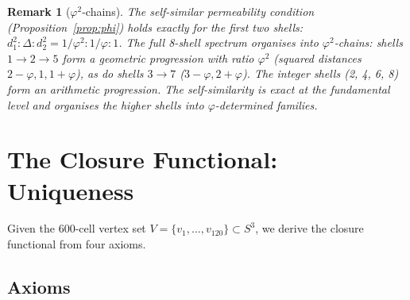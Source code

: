 \documentclass[12pt]{article}
\newtheorem{remark}[theorem]{Remark}
\newcommand{\phig}{\varphi}
\begin{document}
\begin{remark}[$\phig^2$-chains]
The self-similar permeability condition (Proposition~\ref{prop:phi})
holds exactly for the first two shells: $d_1^2 : \Delta : d_2^2 =
1/\phig^2 : 1/\phig : 1$. The full 8-shell spectrum organises into
$\phig^2$-chains: shells $1 \to 2 \to 5$ form a geometric progression
with ratio $\phig^2$ (squared distances $2{-}\phig, 1, 1{+}\phig$), as
do shells $3 \to 7$ ($3{-}\phig, 2{+}\phig$). The integer shells (2, 4,
6, 8) form an arithmetic progression. The self-similarity is exact at
the fundamental level and organises the higher shells into
$\phig$-determined families.
\end{remark}

\section{The Closure Functional: Uniqueness}\label{sec:F}

Given the 600-cell vertex set $V = \{v_1, \ldots, v_{120}\} \subset S^3$,
we derive the closure functional from four axioms.

\subsection{Axioms}
\end{document}
